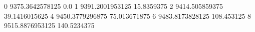 0 9375.3642578125 0.0
1 9391.2001953125 15.8359375
2 9414.505859375 39.1416015625
4 9450.3779296875 75.013671875
6 9483.8173828125 108.453125
8 9515.8876953125 140.5234375
